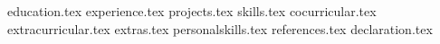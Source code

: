 \documentclass[11pt, a4paper]{awesome-cv}
\newcommand*{\sectiondir}{resume/}
\begin{document}
\makecvheader

{education.tex}
{experience.tex}
{projects.tex}
{skills.tex}
{cocurricular.tex}
{extracurricular.tex}
{extras.tex}
{personalskills.tex}
{references.tex}
{declaration.tex}
\end{document}
